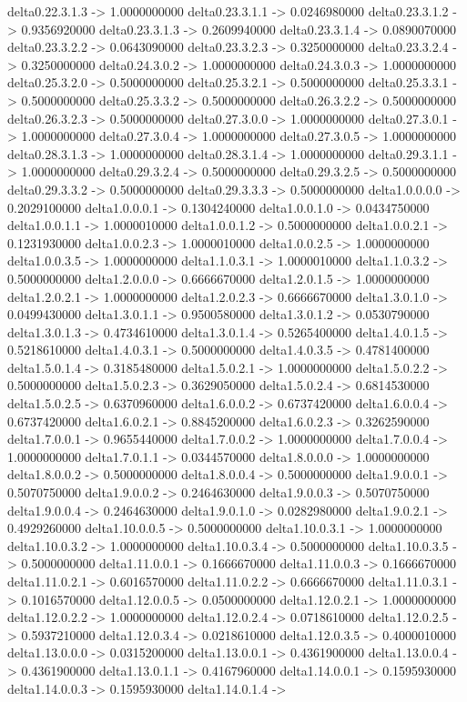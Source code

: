   delta0.22.3.1.3 -> 1.0000000000    delta0.23.3.1.1 -> 0.0246980000    delta0.23.3.1.2 -> 0.9356920000    delta0.23.3.1.3 -> 0.2609940000    delta0.23.3.1.4 -> 0.0890070000    delta0.23.3.2.2 -> 0.0643090000    delta0.23.3.2.3 -> 0.3250000000    delta0.23.3.2.4 -> 0.3250000000    delta0.24.3.0.2 -> 1.0000000000    delta0.24.3.0.3 -> 1.0000000000    delta0.25.3.2.0 -> 0.5000000000    delta0.25.3.2.1 -> 0.5000000000    delta0.25.3.3.1 -> 0.5000000000    delta0.25.3.3.2 -> 0.5000000000    delta0.26.3.2.2 -> 0.5000000000    delta0.26.3.2.3 -> 0.5000000000    delta0.27.3.0.0 -> 1.0000000000    delta0.27.3.0.1 -> 1.0000000000    delta0.27.3.0.4 -> 1.0000000000    delta0.27.3.0.5 -> 1.0000000000    delta0.28.3.1.3 -> 1.0000000000    delta0.28.3.1.4 -> 1.0000000000    delta0.29.3.1.1 -> 1.0000000000    delta0.29.3.2.4 -> 0.5000000000    delta0.29.3.2.5 -> 0.5000000000    delta0.29.3.3.2 -> 0.5000000000    delta0.29.3.3.3 -> 0.5000000000    delta1.0.0.0.0 -> 0.2029100000    delta1.0.0.0.1 -> 0.1304240000    delta1.0.0.1.0 -> 0.0434750000    delta1.0.0.1.1 -> 1.0000010000    delta1.0.0.1.2 -> 0.5000000000    delta1.0.0.2.1 -> 0.1231930000    delta1.0.0.2.3 -> 1.0000010000    delta1.0.0.2.5 -> 1.0000000000    delta1.0.0.3.5 -> 1.0000000000    delta1.1.0.3.1 -> 1.0000010000    delta1.1.0.3.2 -> 0.5000000000    delta1.2.0.0.0 -> 0.6666670000    delta1.2.0.1.5 -> 1.0000000000    delta1.2.0.2.1 -> 1.0000000000    delta1.2.0.2.3 -> 0.6666670000    delta1.3.0.1.0 -> 0.0499430000    delta1.3.0.1.1 -> 0.9500580000    delta1.3.0.1.2 -> 0.0530790000    delta1.3.0.1.3 -> 0.4734610000    delta1.3.0.1.4 -> 0.5265400000    delta1.4.0.1.5 -> 0.5218610000    delta1.4.0.3.1 -> 0.5000000000    delta1.4.0.3.5 -> 0.4781400000    delta1.5.0.1.4 -> 0.3185480000    delta1.5.0.2.1 -> 1.0000000000    delta1.5.0.2.2 -> 0.5000000000    delta1.5.0.2.3 -> 0.3629050000    delta1.5.0.2.4 -> 0.6814530000    delta1.5.0.2.5 -> 0.6370960000    delta1.6.0.0.2 -> 0.6737420000    delta1.6.0.0.4 -> 0.6737420000    delta1.6.0.2.1 -> 0.8845200000    delta1.6.0.2.3 -> 0.3262590000    delta1.7.0.0.1 -> 0.9655440000    delta1.7.0.0.2 -> 1.0000000000    delta1.7.0.0.4 -> 1.0000000000    delta1.7.0.1.1 -> 0.0344570000    delta1.8.0.0.0 -> 1.0000000000    delta1.8.0.0.2 -> 0.5000000000    delta1.8.0.0.4 -> 0.5000000000    delta1.9.0.0.1 -> 0.5070750000    delta1.9.0.0.2 -> 0.2464630000    delta1.9.0.0.3 -> 0.5070750000    delta1.9.0.0.4 -> 0.2464630000    delta1.9.0.1.0 -> 0.0282980000    delta1.9.0.2.1 -> 0.4929260000    delta1.10.0.0.5 -> 0.5000000000    delta1.10.0.3.1 -> 1.0000000000    delta1.10.0.3.2 -> 1.0000000000    delta1.10.0.3.4 -> 0.5000000000    delta1.10.0.3.5 -> 0.5000000000    delta1.11.0.0.1 -> 0.1666670000    delta1.11.0.0.3 -> 0.1666670000    delta1.11.0.2.1 -> 0.6016570000    delta1.11.0.2.2 -> 0.6666670000    delta1.11.0.3.1 -> 0.1016570000    delta1.12.0.0.5 -> 0.0500000000    delta1.12.0.2.1 -> 1.0000000000    delta1.12.0.2.2 -> 1.0000000000    delta1.12.0.2.4 -> 0.0718610000    delta1.12.0.2.5 -> 0.5937210000    delta1.12.0.3.4 -> 0.0218610000    delta1.12.0.3.5 -> 0.4000010000    delta1.13.0.0.0 -> 0.0315200000    delta1.13.0.0.1 -> 0.4361900000    delta1.13.0.0.4 -> 0.4361900000    delta1.13.0.1.1 -> 0.4167960000    delta1.14.0.0.1 -> 0.1595930000    delta1.14.0.0.3 -> 0.1595930000    delta1.14.0.1.4 -> 